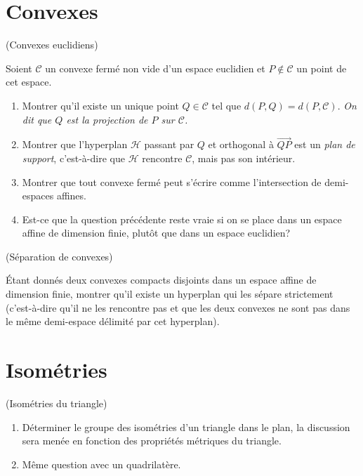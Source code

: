 \documentclass[a4paper,12pt,reqno]{amsart}
\begin{document}
\section{Convexes}

\begin{exo} (Convexes euclidiens)

    Soient $\mathcal{C}$ un convexe fermé non vide d'un espace euclidien et $P \notin \mathcal{C}$ un point de cet espace.
    \begin{enumerate}
       \item Montrer qu'il existe un unique point $Q \in \mathcal{C}$ tel que $d(P,Q) = d(P,\mathcal{C})$. \newline
       \emph{On dit que $Q$ est la projection de $P$ sur $\mathcal{C}$.}

       \item Montrer que l'hyperplan $\mathcal{H}$ passant par $Q$ et orthogonal à $\overrightarrow{QP}$ est un \emph{plan de support}, c'est-à-dire que $\mathcal{H}$ rencontre $\mathcal{C}$, mais pas son intérieur.

       \item Montrer que tout convexe fermé peut s'écrire comme l'intersection de demi-espaces affines.

       \item Est-ce que la question précédente reste vraie si on se place dans un espace affine de dimension finie, plutôt que dans un espace euclidien?
     \end{enumerate}
\end{exo}

\begin{exo} (Séparation de convexes)

  Étant donnés deux convexes compacts disjoints dans un espace affine de dimension finie, montrer qu'il existe un hyperplan qui les sépare strictement (c'est-à-dire qu'il ne les rencontre pas et que les deux convexes ne sont pas dans le même demi-espace délimité par cet hyperplan).
\end{exo}


\section{Isométries}
\begin{exo} (Isométries du triangle)
  \begin{enumerate}
    \item Déterminer le groupe des isométries d'un triangle dans le plan, la discussion sera menée en fonction des propriétés métriques du triangle.
    \item Même question avec un quadrilatère.
  \end{enumerate}
\end{exo}
\end{document}
